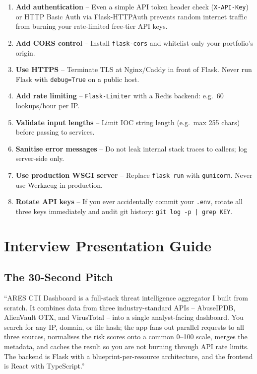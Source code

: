 \documentclass[11pt,a4paper]{article}
\begin{document}
\begin{enumerate}
  \item \textbf{Add authentication} -- Even a simple API token header check (\texttt{X-API-Key}) or HTTP Basic Auth via Flask-HTTPAuth prevents random internet traffic from burning your rate-limited free-tier API keys.
  \item \textbf{Add CORS control} -- Install \texttt{flask-cors} and whitelist only your portfolio's origin.
  \item \textbf{Use HTTPS} -- Terminate TLS at Nginx/Caddy in front of Flask. Never run Flask with \texttt{debug=True} on a public host.
  \item \textbf{Add rate limiting} -- \texttt{Flask-Limiter} with a Redis backend: e.g.\ 60 lookups/hour per IP.
  \item \textbf{Validate input lengths} -- Limit IOC string length (e.g.\ max 255 chars) before passing to services.
  \item \textbf{Sanitise error messages} -- Do not leak internal stack traces to callers; log server-side only.
  \item \textbf{Use production WSGI server} -- Replace \texttt{flask run} with \texttt{gunicorn}. Never use Werkzeug in production.
  \item \textbf{Rotate API keys} -- If you ever accidentally commit your \texttt{.env}, rotate all three keys immediately and audit git history: \texttt{git log -p | grep KEY}.
\end{enumerate}

\newpage

\section{Interview Presentation Guide}

\subsection{The 30-Second Pitch}

\begin{bluebox}
``ARES CTI Dashboard is a full-stack threat intelligence aggregator I built from scratch. It combines data from three industry-standard APIs -- AbuseIPDB, AlienVault OTX, and VirusTotal -- into a single analyst-facing dashboard. You search for any IP, domain, or file hash; the app fans out parallel requests to all three sources, normalises the risk scores onto a common 0--100 scale, merges the metadata, and caches the result so you are not burning through API rate limits. The backend is Flask with a blueprint-per-resource architecture, and the frontend is React with TypeScript.''
\end{bluebox}
\end{document}
